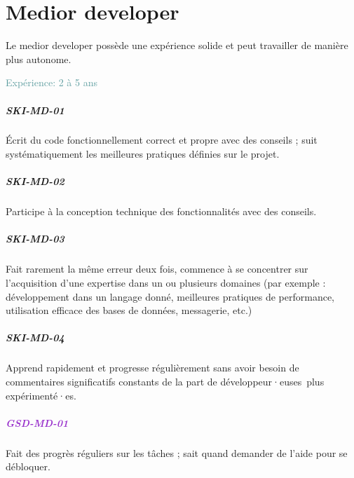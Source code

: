 \documentclass[a4paper, french, openany, 12pt]{book}
\newcommand\dex[1]{\textcolor{BrickRed}{\textbf{\uppercase{ski-{#1}}}}}
\newcommand\str[1]{\textcolor{DarkOrchid}{\textbf{\uppercase{gsd-{#1}}}}}
\newcommand\xp[1]{\textcolor{CadetBlue}{Expérience: {#1} ans}}
\newcommand\devs{développeur·euses}
\begin{document}
\chapter{Medior developer}

Le medior developer possède une expérience solide et peut travailler de manière plus autonome.

\xp{2 à 5}

\begin{multicols}{2}

  \paragraph*{\dex{md-01}}

  Écrit du code fonctionnellement correct et propre avec des conseils ; suit systématiquement les meilleures pratiques
  définies sur le projet.

  \paragraph*{\dex{md-02}}

  Participe à la conception technique des fonctionnalités avec des conseils.

  \paragraph*{\dex{md-03}}

  Fait rarement la même erreur deux fois, commence à se concentrer sur l'acquisition d'une expertise dans un ou plusieurs
  domaines (par exemple : développement dans un langage donné, meilleures pratiques de performance, utilisation efficace
  des bases de données, messagerie, etc.)

  \paragraph*{\dex{md-04}}

  Apprend rapidement et progresse régulièrement sans avoir besoin de commentaires significatifs constants de la part
  de \devs\ plus expérimenté·es.

  \paragraph*{\str{md-01}}

  Fait des progrès réguliers sur les tâches ; sait quand demander de l'aide pour se débloquer.


\end{multicols}
\end{document}
